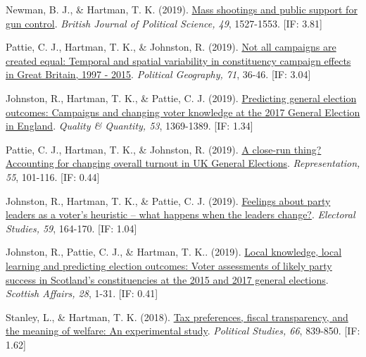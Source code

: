 \documentclass[12pt]{article}
\begin{document}
\begin{bibenum}
    \item *Newman, B. J., \& {Hartman, T. K.} (2019).
          \href{https://10.1017/S0007123417000333}
          {Mass shootings and public support for gun control}.
          \emph{British Journal of Political Science, 49}, 1527-1553. [IF: 3.81]
      
	\item Pattie, C. J., {Hartman, T. K.}, \& Johnston, R. (2019). 
	    \href{https://10.1016/j.polgeo.2019.02.010}
		{Not all campaigns are created equal: Temporal and spatial variability 
		in constituency campaign effects in Great Britain, 1997 - 2015}. 
	 	\emph{Political Geography, 71}, 36-46. [IF: 3.04]
	 	    
	\item Johnston, R., {Hartman, T. K.}, \& Pattie, C. J. (2019). 
		\href{https://10.1007/s11135-018-0819-1}
		{Predicting general election outcomes: Campaigns and changing voter 
		knowledge at the 2017 General Election in England}.
		\emph{Quality \& Quantity, 53}, 1369-1389. [IF: 1.34]
	 	    
    \item Pattie, C. J., {Hartman, T. K.}, \& Johnston, R. (2019).
    	\href{https://10.1080/00344893.2018.1555676}
    	{A close-run thing? Accounting for changing overall turnout in UK General Elections}.
    	\emph{Representation, 55}, 101-116. [IF: 0.44]

    \item Johnston, R., {Hartman, T. K.}, \& Pattie, C. J. (2019). 
    		\href{https://10.1016/j.electstud.2018.12.005}
    		{Feelings about party leaders as a voter's heuristic -- 
    		what happens when the leaders change?}.
        \emph{Electoral Studies, 59}, 164-170. [IF: 1.04]
          
	\item Johnston, R., Pattie, C. J., \& {Hartman, T. K.}. (2019). 
		\href{https://10.3366/scot.2019.0263}
		{Local knowledge, local learning and predicting election outcomes: 
		Voter assessments of likely party success in Scotland's constituencies 
		at the 2015 and 2017 general elections}.
		\emph{Scottish Affairs, 28}, 1-31. [IF: 0.41]
		
	\item Stanley, L., \& {Hartman, T. K.} (2018).
          \href{https://10.1177/0032321717731661}
          {Tax preferences, fiscal transparency, and the meaning of welfare: 
          An experimental study}. 
          \emph{Political Studies, 66}, 839-850. [IF: 1.62]
          

\end{bibenum}
\end{document}
